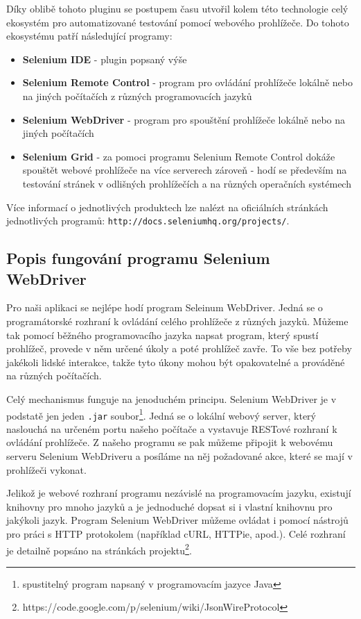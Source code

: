 \documentclass[thesis=M,czech]{FITthesis}[2013/05/10]
\begin{document}
Díky oblibě tohoto pluginu se postupem času utvořil kolem této technologie celý ekosystém pro automatizované testování pomocí webového prohlížeče. Do tohoto ekosystému patří následující programy:

\begin{itemize}
  \item \textbf{Selenium IDE} - plugin popsaný výše
  \item \textbf{Selenium Remote Control} - program pro ovládání prohlížeče lokálně nebo na jiných počítačích z různých programovacích jazyků
  \item \textbf{Selenium WebDriver} - program pro spouštění prohlížeče lokálně nebo na jiných počítačích
  \item \textbf{Selenium Grid} - za pomoci programu Selenium Remote Control dokáže spouštět webové prohlížeče na více serverech zároveň - hodí se především na testování stránek v odlišných prohlížečích a na různých operačních systémech
\end{itemize}

Více informací o jednotlivých produktech lze nalézt na oficiálních stránkách jednotlivých programů: \verb|http://docs.seleniumhq.org/projects/|. 

\subsection{Popis fungování programu Selenium WebDriver}

Pro naši aplikaci se nejlépe hodí program Seleinum WebDriver. Jedná se o programátorské rozhraní k ovládání celého prohlížeče z různých jazyků. Můžeme tak pomocí běžného programovacího jazyka napsat program, který spustí prohlížeč, provede v něm určené úkoly a poté prohlížeč zavře. To vše bez potřeby jakékoli lidské interakce, takže tyto úkony mohou být opakovatelné a prováděné na různých počítačích.

Celý mechanismus funguje na jenoduchém principu. Selenium WebDriver je v podstatě jen jeden \verb|.jar| soubor\footnote{spustitelný program napsaný v programovacím jazyce Java}. Jedná se o lokální webový server, který naslouchá na určeném portu našeho počítače a vystavuje RESTové rozhraní k ovládání prohlížeče. Z našeho programu se pak můžeme připojit k webovému serveru Selenium WebDriveru a posíláme na něj požadované akce, které se mají v prohlížeči vykonat. 

Jelikož je webové rozhraní programu nezávislé na programovacím jazyku, existují knihovny pro mnoho jazyků a je jednoduché dopsat si i vlastní knihovnu pro jakýkoli jazyk. Program Selenium WebDriver můžeme ovládat i pomocí nástrojů pro práci s HTTP protokolem (například cURL, HTTPie, apod.). Celé rozhraní je detailně popsáno na stránkách projektu\footnote{https://code.google.com/p/selenium/wiki/JsonWireProtocol}.
\end{document}

